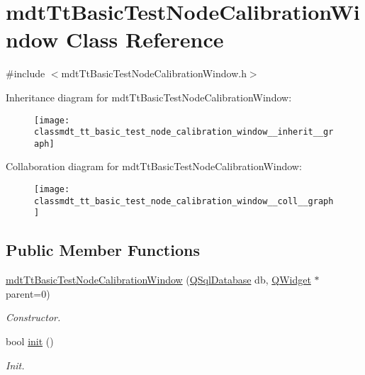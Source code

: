 \hypertarget{classmdt_tt_basic_test_node_calibration_window}{\section{mdt\-Tt\-Basic\-Test\-Node\-Calibration\-Window Class Reference}
\label{classmdt_tt_basic_test_node_calibration_window}
}


{\ttfamily \#include $<$mdt\-Tt\-Basic\-Test\-Node\-Calibration\-Window.\-h$>$}



Inheritance diagram for mdt\-Tt\-Basic\-Test\-Node\-Calibration\-Window\-:\nopagebreak
\begin{figure}[H]
\begin{center}
\leavevmode
\texttt{[image: classmdt\_tt\_basic\_test\_node\_calibration\_window\_\_inherit\_\_graph]}
\end{center}
\end{figure}


Collaboration diagram for mdt\-Tt\-Basic\-Test\-Node\-Calibration\-Window\-:\nopagebreak
\begin{figure}[H]
\begin{center}
\leavevmode
\texttt{[image: classmdt\_tt\_basic\_test\_node\_calibration\_window\_\_coll\_\_graph]}
\end{center}
\end{figure}
\subsection*{Public Member Functions}
\begin{DoxyCompactItemize}
\item 
\hyperlink{classmdt_tt_basic_test_node_calibration_window_a717d3457bd131bd32fb673afa3d77c75}{mdt\-Tt\-Basic\-Test\-Node\-Calibration\-Window} (\hyperlink{class_q_sql_database}{Q\-Sql\-Database} db, \hyperlink{class_q_widget}{Q\-Widget} $\ast$parent=0)
\begin{DoxyCompactList}\small\item\em Constructor. \end{DoxyCompactList}\item 
bool \hyperlink{classmdt_tt_basic_test_node_calibration_window_a9ee28a2f55b8a5bfc5ee3a6af54d5c5d}{init} ()
\begin{DoxyCompactList}\small\item\em Init. \end{DoxyCompactList}\end{DoxyCompactItemize}


